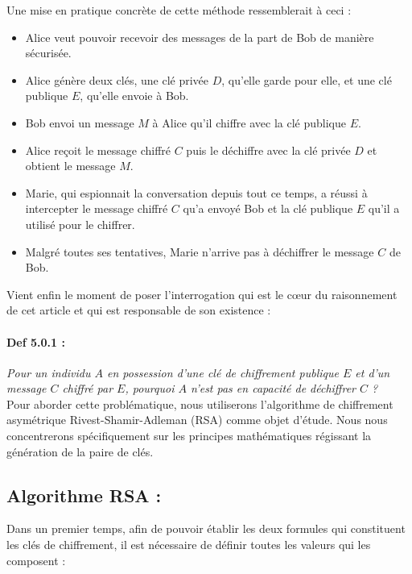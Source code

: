 \documentclass{article}
\begin{document}
Une mise en pratique concrète de cette méthode ressemblerait à ceci :

\begin{itemize}
	\item
	Alice veut pouvoir recevoir des messages de la part de Bob de manière
	sécurisée.
	\item
	Alice génère deux clés, une clé privée \(D\), qu'elle garde pour elle,
	et une clé publique \(E\), qu'elle envoie à Bob.
	\item
	Bob envoi un message \(M\) à Alice qu'il chiffre avec la clé publique
	\(E\).
	\item
	Alice reçoit le message chiffré \(C\) puis le déchiffre avec la clé
	privée \(D\) et obtient le message \(M\).
	\item
	Marie, qui espionnait la conversation depuis tout ce temps, a réussi à
	intercepter le message chiffré \(C\) qu'a envoyé Bob et la clé
	publique \(E\) qu'il a utilisé pour le chiffrer.
	\item
	Malgré toutes ses tentatives, Marie n'arrive pas à déchiffrer le
	message \(C\) de Bob.\\
\end{itemize}

Vient enfin le moment de poser l'interrogation qui est le cœur du
raisonnement de cet article et qui est responsable de son existence :

\paragraph{Def 5.0.1 :}\label{def-5.0.1}

\textit{Pour un individu \(A\) en possession d'une clé de chiffrement
	publique \(E\) et d'un message \(C\) chiffré par \(E\), pourquoi \(A\)
	n'est pas en capacité de déchiffrer \(C\) ?} \\

Pour aborder cette problématique, nous utiliserons l'algorithme de
chiffrement asymétrique Rivest-Shamir-Adleman (RSA) comme objet d'étude.
Nous nous concentrerons spécifiquement sur les principes mathématiques
régissant la génération de la paire de clés.

\clearpage

\subsection{Algorithme RSA :}\label{algorithme-rsa}

Dans un premier temps, afin de pouvoir établir les deux formules qui
constituent les clés de chiffrement, il est nécessaire de définir toutes
les valeurs qui les composent :
\end{document}

